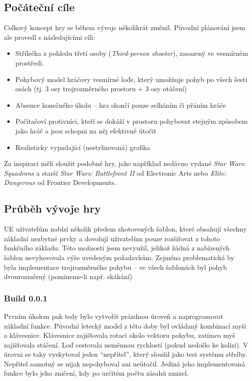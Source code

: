 \documentclass[12pt,a4paper,hidelinks]{article}
\begin{document}
\subsection{Počáteční cíle}
Celkový koncept hry se během vývoje několikrát změnil. Původní plánování jsem ale provedl s následujícími cíli:
\begin{itemize}
	\item Střílečka z pohledu třetí osoby (\textit{Third-person shooter}), zasazený ve vesmírném prostředí.
	\item Pohybový model hráčovy vesmírné loďe, který umožňuje pohyb po všech šesti osách (tj. 3 osy trojrozměrného prostoru + 3 osy otáčení)
	\item Absence konečného úkolu – hra skončí pouze selháním či přáním hráče
	\item Počítačoví protivníci, kteří se dokáží v prostoru pohybovat stejným způsobem jako hráč a jsou schopni na něj efektivně útočit
	\item Realisticky vypadající (nestylizovaná) grafika
\end{itemize}

Za inspiraci měli sloužit podobné hry, jako například nedávno vydané \textit{Star Wars: Squadrons} a starší \textit{Star Wars: Battlefront II} od Electronic Arts nebo \textit{Elite: Dangerous} od Frontier Developments.\\

\subsection{Průběh vývoje hry}
UE uživatelům nabízí několik předem zhotovených šablon, které obsahují všechny základní nezbytné prvky a dovolují uživatelům pouze rozšiřovat z tohoto funkčního základu. Této možnosti jsem nevyužil, jelikož žádná z nabízených šablon nevyhovovala výše uvedeným požadavkům. Zejména problematická by byla implementace trojrozměrného pohybu – ve všech šablonách byl pohyb dvourozměrný (pomineme-li např. skákání)\\
\subsubsection{Build 0.0.1}
Prvním úkolem pak tedy bylo vytvořit prázdnou úroveň a naprogramovat základní funkce. Původní letecký model z této doby byl ovládaný kombinací myši a klávesnice. Klávesnice zajišťovala rotaci okolo vektoru pohybu, zatímco myš zajišťovala stáčení. Loď cestovala neměnnou rychlostí (pokud nedošlo ke kolizi). V úrovni se taky vyskytoval jeden \enquote{nepřítel}, který sloužil jako test systému střelby. Nepřítel samotný se nijak nepohyboval ani neútočil. Jediná jeho implementovaná funkce bylo jeho zničení, kdy po určitém počtu zásahů zmizel.\\
\end{document}
